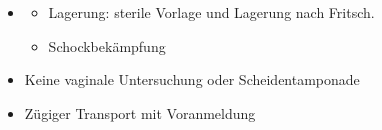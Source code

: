\label{m:plazentaloesung}
\begin{itemize}
  \item \TxMassVitMKBes
  \begin{itemize}
    \item Lagerung: sterile Vorlage und Lagerung nach Fritsch.
    \item Schockbekämpfung
  \end{itemize}
  \item Keine vaginale Untersuchung oder  Scheidentamponade
  \item Zügiger Transport mit Voranmeldung
\end{itemize}